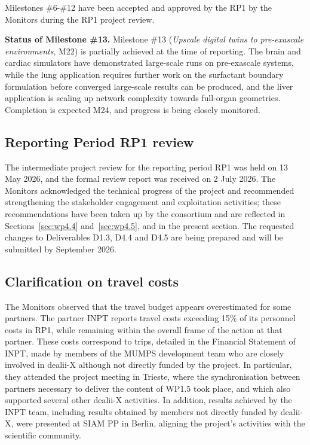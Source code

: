 \documentclass[a4paper,12pt, numbers]{article}
\begin{document}
Milestones \#6-\#12 have been accepted and approved by the RP1 by the Monitors during the RP1 project review. 

\noindent\textbf{Status of Milestone \#13.}
Milestone \#13 (\emph{Upscale digital twins to pre-exascale environments}, M22) is partially achieved at the time of reporting. The brain and cardiac simulators have demonstrated large-scale runs on pre-exascale systems, while the lung application requires further work on the surfactant boundary formulation before converged large-scale results can be produced, and the liver application is scaling up network complexity towards full-organ geometries. Completion is expected M24, and progress is being closely monitored.


\subsection{Reporting Period RP1 review}

The intermediate project review for the reporting period RP1 was held on 13 May 2026, and the formal review report was received on 2 July 2026. The Monitors acknowledged the technical progress of the project and recommended strengthening the stakeholder engagement and exploitation activities; these recommendations have been taken up by the consortium and are reflected in Sections~\ref{sec:wp4.4} and~\ref{sec:wp4.5}, and in the present section. The requested changes to Deliverables D1.3, D4.4 and D4.5 are being prepared and will be submitted by September 2026.


\subsection{Clarification on travel costs}

The Monitors observed that the travel budget appears overestimated for some partners. The partner INPT reports travel costs exceeding 15\% of its personnel costs in RP1, while remaining within the overall frame of the action at that partner. These costs correspond to trips, detailed in the Financial Statement of INPT, made by members of the MUMPS development team who are closely involved in dealii-X although not directly funded by the project. In particular, they attended the project meeting in Trieste, where the synchronisation between partners necessary to deliver the content of WP1.5 took place, and which also supported several other dealii-X activities. In addition, results achieved by the INPT team, including results obtained by members not directly funded by dealii-X, were presented at SIAM PP in Berlin, aligning the project's activities with the scientific community.
\end{document}
